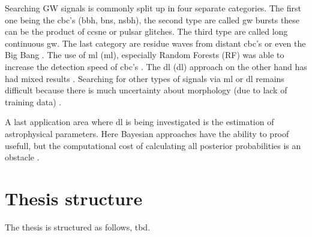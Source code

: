 Searching GW signals is commonly split up in four separate categories. The first one being the \acrshort{cbc}'s (\acrshort{bbh}, \acrshort{bns}, \acrshort{nsbh}), the second type are called \acrshort{gw} bursts these can be the product of \acrshort{ccsne} or pulsar glitches. The third type are called long continuous \acrshort{gw}. The last category are residue waves from distant \acrshort{cbc}'s or even the Big Bang
\citep{abbott2020guide, LIGO_continuous}. The use of \acrlong{ml} (\acrshort{ml}), especially Random Forests (RF) was able to increase the detection speed of \acrshort{cbc}'s \citep{kapadia2017classifier}. The \acrlong{dl} (\acrshort{dl}) approach on the other hand has had mixed results \citep{gebhard2019convolutional,chatterjee2021extraction,ruan2023rapid}. 
Searching for other types of signals via \acrshort{ml} or \acrshort{dl} remains difficult because there is much uncertainty about morphology (due to lack of training data) \citep{cuoco2020enhancing}. 

A last application area where \acrshort{dl} is being investigated is the estimation of astrophysical parameters. Here Bayesian approaches have the ability to proof usefull, but the computational cost of calculating all posterior probabilities is an obstacle \citep{cuoco2020enhancing}.

\section{Thesis structure}
The thesis is structured as follows, tbd.
\newpage



